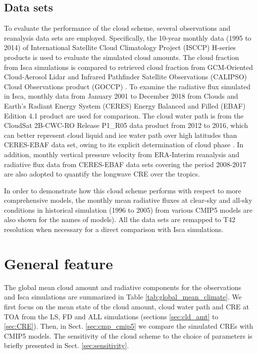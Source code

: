 \subsection{Data sets}
To evaluate the performance of the cloud scheme, several observations and reanalysis data sets are employed. Specifically, the 10-year monthly data (1995 to 2014) of International Satellite Cloud Climatology Project (ISCCP) H-series products \citep{Young2018} is used to evaluate the simulated cloud amounts. The cloud fraction from Isca simulations is compared to retrieved cloud fraction from GCM-Oriented Cloud-Aerosol Lidar and Infrared Pathfinder Satellite Observations (CALIPSO) Cloud Observations product (GOCCP) \citep{Chepfer2010}. To examine the radiative flux simulated in Isca, monthly data from January 2001 to December 2018 from Clouds and Earth's Radiant Energy System (CERES) Energy Balanced and Filled (EBAF) Edition 4.1 product \citep[CERES-EBAF hereafter;][]{Loeb2018} are used for comparison. The cloud water path is from the CloudSat 2B-CWC-RO Release P1\_R05 data product \citep{Austin2009} from 2012 to 2016, which can better represent cloud liquid and ice water path over high latitudes than CERES-EBAF data set, owing to its explicit determination of cloud phase \citep{Lenaerts2017}. In addition, monthly vertical pressure velocity from ERA-Interim reanalysis and radiative flux data from CERES-EBAF data sets covering the period 2008-2017 are also adopted to quantify the longwave CRE over the tropics.

In order to demonstrate how this cloud scheme performs with respect to more comprehensive models, the monthly mean radiative fluxes at clear-sky and all-sky conditions in historical simulation (1996 to 2005) from various CMIP5 models are also shown for the names of models). All the data sets are remapped to T42 resolution when necessary for a direct comparison with Isca simulations.

\section{General feature}

The global mean cloud amount and radiative components for the observations and Isca simulations are summarized in Table \ref{tab:global_mean_climate}. We first focus on the mean state of the cloud amount, cloud water path and CRE at TOA from the LS, FD and ALL simulations (sections \ref{sec:cld_amt} to \ref{sec:CRE}). Then, in Sect. \ref{sec:cmp_cmip5} we compare the simulated CREs with CMIP5 models. The sensitivity of the cloud scheme to the choice of parameters is briefly presented in Sect. \ref{sec:sensitivity}.

